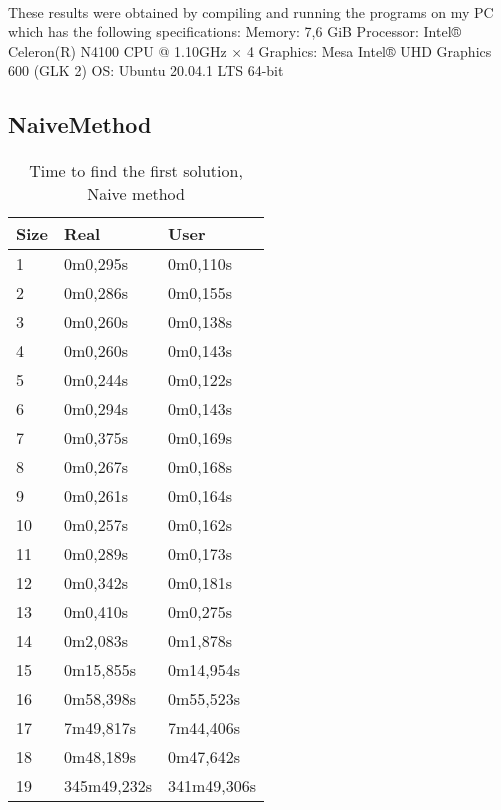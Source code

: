 \documentclass[runningheads]{llncs}
\begin{document}
\paragraph{}

These results were obtained by compiling and running the programs on my PC which has the following specifications: \hfill\break
Memory: 7,6 GiB\hfill\break
Processor: Intel® Celeron(R) N4100 CPU @ 1.10GHz × 4\hfill\break
Graphics: Mesa Intel® UHD Graphics 600 (GLK 2)\hfill\break
OS: Ubuntu 20.04.1 LTS 64-bit\hfill\break

\subsection{NaiveMethod}
\paragraph{}

\begin{table}[H]
\centering
\caption{Time to find the first solution, Naive method}\label{NAVF}
\begin{tabular}{|l|l|l|}
\hline
Size & Real & User\\
\hline
1 & 0m0,295s & 0m0,110s\\
2 & 0m0,286s & 0m0,155s\\
3 & 0m0,260s & 0m0,138s\\
4 & 0m0,260s & 0m0,143s\\
5 & 0m0,244s & 0m0,122s\\
6 & 0m0,294s & 0m0,143s\\
7 & 0m0,375s & 0m0,169s\\
8 & 0m0,267s & 0m0,168s\\
9 & 0m0,261s & 0m0,164s\\
10 & 0m0,257s & 0m0,162s\\
11 & 0m0,289s & 0m0,173s\\
12 & 0m0,342s & 0m0,181s\\
13 & 0m0,410s & 0m0,275s\\
14 & 0m2,083s & 0m1,878s\\
15 & 0m15,855s & 0m14,954s\\
16 & 0m58,398s & 0m55,523s\\
17 & 7m49,817s & 7m44,406s\\
18 & 0m48,189s & 0m47,642s\\
19 & 345m49,232s & 341m49,306s\\
\hline
\end{tabular}
\end{table}
\end{document}
